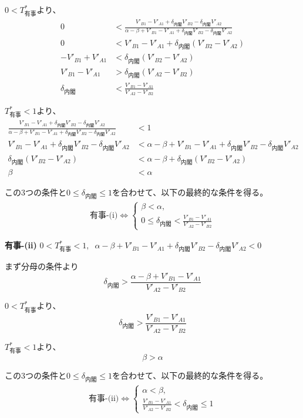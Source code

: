 \documentclass[main.tex]{subfiles}
\begin{document}
$0<T^*_{有事}$より、
\begin{align*}
    0 &< \frac{ V'_{B1} - V'_{A1} +\delta_{内閣}V'_{B2} - \delta_{内閣}V'_{A2} }{ \alpha-\beta + V'_{B1}-V'_{A1} + \delta_{内閣}V'_{B2} - \delta_{内閣}V'_{A2} }\\
    0 &<  V'_{B1} - V'_{A1} +\delta_{内閣}(V'_{B2} - V'_{A2})\\
    -V'_{B1} + V'_{A1} &< \delta_{内閣}(V'_{B2} - V'_{A2})\\
    V'_{B1} - V'_{A1} &> \delta_{内閣}(V'_{A2} - V'_{B2})\\
    \delta_{内閣} &< \frac{V'_{B1} - V'_{A1}}{V'_{A2} - V'_{B2}}
\end{align*}


$T^*_{有事}<1$より、
\begin{align*}
    \frac{ V'_{B1} - V'_{A1} +\delta_{内閣}V'_{B2} - \delta_{内閣}V'_{A2} }{ \alpha-\beta + V'_{B1}-V'_{A1} + \delta_{内閣}V'_{B2} - \delta_{内閣}V'_{A2} } &< 1\\
    V'_{B1} - V'_{A1} +\delta_{内閣}V'_{B2} - \delta_{内閣}V'_{A2} &< \alpha-\beta + V'_{B1}-V'_{A1} + \delta_{内閣}V'_{B2} - \delta_{内閣}V'_{A2}\\
    \delta_{内閣}(V'_{B2} - V'_{A2}) &< \alpha-\beta + \delta_{内閣}(V'_{B2} - V'_{A2})\\
    \beta &< \alpha
\end{align*}

この3つの条件と$0 \le \delta_{内閣} \le 1$を合わせて、以下の最終的な条件を得る。
\begin{align*}
    \text{有事-(i)} \Leftrightarrow 
    \begin{cases}
        \beta < \alpha, \\
        0 \le \delta_{内閣} < \frac{V'_{B1}-V'_{A1}}{V'_{A2} - V'_{B2}}
    \end{cases}
\end{align*}



\bigskip
\noindent
\textbf{有事-(ii)}\; $0<T^*_{有事}<1,\;\; \alpha-\beta + V'_{B1}-V'_{A1} + \delta_{内閣}V'_{B2} - \delta_{内閣}V'_{A2} < 0$

まず分母の条件より
$$\delta_{内閣} > \frac{\alpha-\beta + V'_{B1}-V'_{A1}}{V'_{A2} - V'_{B2}}$$

$0<T^*_{有事}$より、
$$\delta_{内閣} > \frac{V'_{B1} - V'_{A1}}{V'_{A2} - V'_{B2}}$$

$T^*_{有事}<1$より、
$$\beta > \alpha$$

この3つの条件と$0 \le \delta_{内閣} \le 1$を合わせて、以下の最終的な条件を得る。
\begin{align*}
    \text{有事-(ii)} \Leftrightarrow 
    \begin{cases}
        \alpha < \beta, \\
        \frac{V'_{B1}-V'_{A1}}{V'_{A2} - V'_{B2}} < \delta_{内閣} \le 1
    \end{cases}
\end{align*}
\end{document}
